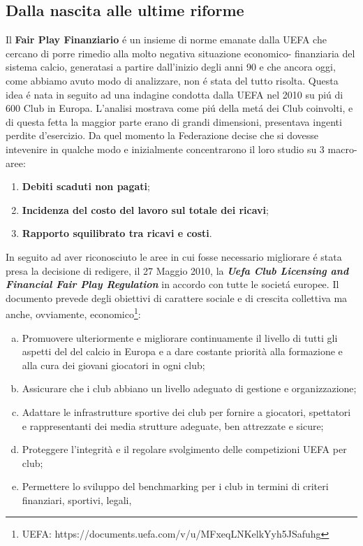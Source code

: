 \documentclass[
    corpo=12pt,
    oneside,
    evenboxes,
    tipotesi=triennale,
    stile=classica,
    oldstyle,
    autoretitolo,
    greek,
]{toptesi}
\begin{document}
\begin{interlinea}{1.5}
\section{Dalla nascita alle ultime riforme}
Il \textbf{Fair Play Finanziario} \'e un insieme di norme emanate dalla UEFA che cercano di porre rimedio alla molto negativa situazione economico-
finanziaria del sistema calcio, generatasi a partire dall'inizio degli anni 90 e che ancora oggi, come abbiamo avuto modo di analizzare, non 
\'e stata del tutto risolta.
Questa idea \'e nata in seguito ad una indagine condotta dalla UEFA nel 2010 su pi\'u di 600 Club in Europa. 
L'analisi mostrava come pi\'u della met\'a dei Club coinvolti, e di questa fetta la maggior parte erano di grandi dimensioni, 
presentava ingenti perdite d'esercizio. Da quel momento la Federazione decise che si dovesse intevenire in qualche modo e inizialmente
concentrarono il loro studio su 3 macro-aree:
\begin{enumerate}
    \item \textbf{Debiti scaduti non pagati};
    \item \textbf{Incidenza del costo del lavoro sul totale dei ricavi};
    \item \textbf{Rapporto squilibrato tra ricavi e costi}.
\end{enumerate}
In seguito ad aver riconosciuto le aree in cui fosse necessario migliorare \'e stata presa la decisione di redigere, il 27 Maggio 2010, la 
\textbf{\emph{Uefa Club Licensing and Financial Fair Play Regulation}} in accordo con tutte le societ\'a europee.
Il documento prevede degli obiettivi di carattere sociale e di crescita collettiva ma anche, ovviamente, economico\footnote{UEFA: https://documents.uefa.com/v/u/MFxeqLNKelkYyh5JSafuhg}:
\begin{enumerate}[(a)]
    \item Promuovere ulteriormente e migliorare continuamente il livello di tutti gli aspetti del
    del calcio in Europa e a dare costante priorità alla formazione e alla cura dei
    giovani giocatori in ogni club; 
    \item Assicurare che i club abbiano un livello adeguato di gestione e organizzazione;
    \item Adattare le infrastrutture sportive dei club per fornire a giocatori, spettatori e rappresentanti dei media
    strutture adeguate, ben attrezzate e sicure;
    \item Proteggere l'integrità e il regolare svolgimento delle competizioni UEFA per club;
    \item Permettere lo sviluppo del benchmarking per i club in termini di criteri finanziari, sportivi, legali,

\end{enumerate}
\end{interlinea}
\end{document}
